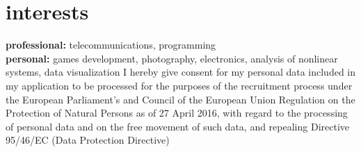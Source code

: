 \documentclass[]{friggeri-cv} %
\begin{document}
\section{interests}

\textbf{professional:} telecommunications, programming \\
\textbf{personal:} games development, photography, electronics, analysis of nonlinear systems, data visualization
\vfill
\footnotesize{I hereby give consent for my personal data included in my application to be processed for the purposes of the recruitment process under the European Parliament's and Council of the European Union Regulation on the Protection of Natural Persons as of 27 April 2016, with regard to the processing of personal data and on the free movement of such data, and repealing Directive 95/46/EC (Data Protection Directive)
}
\end{document}
